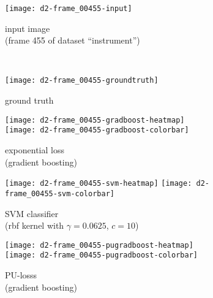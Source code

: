 \begin{figure}[ht]
	\centering
 	\begin{subfigure}[h]{0.48\textwidth}
	  \texttt{[image: d2-frame\_00455-input]}
	  \caption*{input image \\ (frame 455 of dataset ``instrument'')}
	\end{subfigure}
	~
	\begin{subfigure}[h]{0.48\textwidth}
	  \texttt{[image: d2-frame\_00455-groundtruth]}
	  \caption*{ground truth \\ \quad}
	\end{subfigure}
	
	\vspace{3mm}
	\begin{subfigure}[h]{0.495\textwidth}
	  \texttt{[image: d2-frame\_00455-gradboost-heatmap]}
	  \texttt{[image: d2-frame\_00455-gradboost-colorbar]}
	  \caption*{exponential loss \\ (gradient boosting)}
	\end{subfigure}
	
	\vspace{3mm}
	\begin{subfigure}[h]{0.495\textwidth}
	  \texttt{[image: d2-frame\_00455-svm-heatmap]}
	  \texttt{[image: d2-frame\_00455-svm-colorbar]}
	  \caption*{SVM classifier \\ (rbf kernel with $\gamma = 0.0625$, $c = 10$)\\}
	\end{subfigure}	
	\begin{subfigure}[h]{0.495\textwidth}
	  \texttt{[image: d2-frame\_00455-pugradboost-heatmap]}
	  \texttt{[image: d2-frame\_00455-pugradboost-colorbar]}
		  \caption*{PU-losss \\ (gradient boosting)}
	\end{subfigure}		
	\caption{}
	\label{fig:bias-in-heatmaps}
\end{figure}

